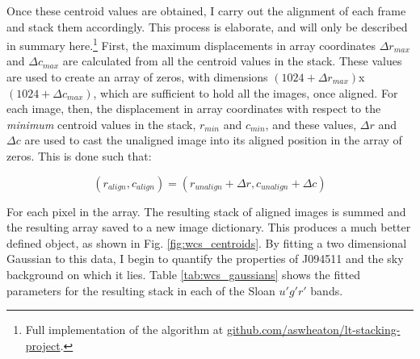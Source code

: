 \documentclass[a4paper,11pt]{article}
\begin{document}
Once these centroid values are obtained, I carry out the alignment of each frame and stack them accordingly. This process is elaborate, and will only be described in summary here.\footnote{Full implementation of the algorithm at \url{github.com/aswheaton/lt-stacking-project}.} First, the maximum displacements in array coordinates $\Delta r_{max}$ and $\Delta c_{max}$ are calculated from all the centroid values in the stack. These values are used to create an array of zeros, with dimensions $(1024+\Delta r_{max})$x$(1024+\Delta c_{max})$, which are sufficient to hold all the images, once aligned. For each image, then, the displacement in array coordinates with respect to the \textit{minimum} centroid values in the stack, $r_{min}$ and $c_{min}$, and these values, $\Delta r$ and $\Delta c$ are used to cast the unaligned image into its aligned position in the array of zeros. This is done such that:

\begin{equation}
    (r_{align}, c_{align}) = (r_{unalign} + \Delta r, c_{unalign} + \Delta c)
\end{equation}

\noindent For each pixel in the array. The resulting stack of aligned images is summed and the resulting array saved to a new image dictionary. This produces a much better defined object, as shown in Fig. \ref{fig:wcs_centroids}. By fitting a two dimensional Gaussian to this data, I begin to quantify the properties of J094511 and the sky background on which it lies. Table \ref{tab:wcs_gaussians} shows the fitted parameters for the resulting stack in each of the Sloan $u'g'r'$ bands.
\end{document}
